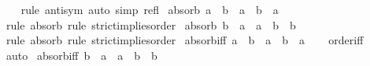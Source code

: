 \begin{isabellebody}
%
\isadelimproof
\ \ %
\endisadelimproof
%
\isatagproof
{}\isamarkupfalse%
\ {\isacharparenleft}{\kern0pt}rule\ antisym{\isacharparenright}{\kern0pt}\ {\isacharparenleft}{\kern0pt}auto\ simp{\isacharcolon}{\kern0pt}\ refl{\isacharparenright}{\kern0pt}%
\endisatagproof
{\isafoldproof}%
%
\isadelimproof
\isanewline
%
\endisadelimproof
\isanewline
{}\isamarkupfalse%
\ absorb{}{\isacharcolon}{\kern0pt}\ {\isachardoublequoteopen}a\ \isactrlbold {\isacharless}{\kern0pt}\ b\ {\isasymLongrightarrow}\ a\ \isactrlbold {\isacharasterisk}{\kern0pt}\ b\ {\isacharequal}{\kern0pt}\ a{\isachardoublequoteclose}\isanewline
%
\isadelimproof
\ \ %
\endisadelimproof
%
\isatagproof
{}\isamarkupfalse%
\ {\isacharparenleft}{\kern0pt}rule\ absorb{}{\isacharparenright}{\kern0pt}\ {\isacharparenleft}{\kern0pt}rule\ strict{\isacharunderscore}{\kern0pt}implies{\isacharunderscore}{\kern0pt}order{\isacharparenright}{\kern0pt}%
\endisatagproof
{\isafoldproof}%
%
\isadelimproof
\isanewline
%
\endisadelimproof
\isanewline
{}\isamarkupfalse%
\ absorb{}{\isacharcolon}{\kern0pt}\ {\isachardoublequoteopen}b\ \isactrlbold {\isacharless}{\kern0pt}\ a\ {\isasymLongrightarrow}\ a\ \isactrlbold {\isacharasterisk}{\kern0pt}\ b\ {\isacharequal}{\kern0pt}\ b{\isachardoublequoteclose}\isanewline
%
\isadelimproof
\ \ %
\endisadelimproof
%
\isatagproof
{}\isamarkupfalse%
\ {\isacharparenleft}{\kern0pt}rule\ absorb{}{\isacharparenright}{\kern0pt}\ {\isacharparenleft}{\kern0pt}rule\ strict{\isacharunderscore}{\kern0pt}implies{\isacharunderscore}{\kern0pt}order{\isacharparenright}{\kern0pt}%
\endisatagproof
{\isafoldproof}%
%
\isadelimproof
\isanewline
%
\endisadelimproof
\isanewline
{}\isamarkupfalse%
\ absorb{\isacharunderscore}{\kern0pt}iff{}{\isacharcolon}{\kern0pt}\ {\isachardoublequoteopen}a\ \isactrlbold {\isasymle}\ b\ {\isasymlongleftrightarrow}\ a\ \isactrlbold {\isacharasterisk}{\kern0pt}\ b\ {\isacharequal}{\kern0pt}\ a{\isachardoublequoteclose}\isanewline
%
\isadelimproof
\ \ %
\endisadelimproof
%
\isatagproof
{}\isamarkupfalse%
\ order{\isacharunderscore}{\kern0pt}iff\ \isamarkupfalse%
\ auto%
\endisatagproof
{\isafoldproof}%
%
\isadelimproof
\isanewline
%
\endisadelimproof
\isanewline
{}\isamarkupfalse%
\ absorb{\isacharunderscore}{\kern0pt}iff{}{\isacharcolon}{\kern0pt}\ {\isachardoublequoteopen}b\ \isactrlbold {\isasymle}\ a\ {\isasymlongleftrightarrow}\ a\ \isactrlbold {\isacharasterisk}{\kern0pt}\ b\ {\isacharequal}{\kern0pt}\ b{\isachardoublequoteclose}\isanewline

\end{isabellebody}

